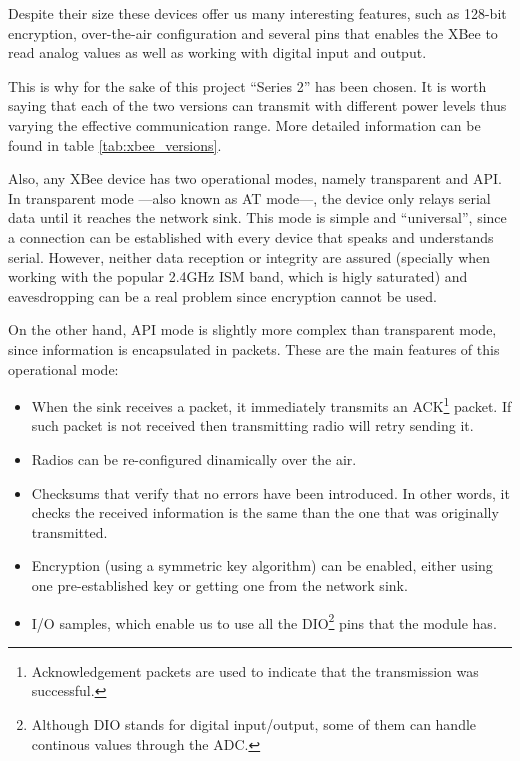 Despite their size these devices offer us many interesting features, such as 128-bit encryption, over-the-air configuration and several pins that enables the XBee to read analog values as well as working with digital input and output\citep{xbeedatasheet}.

This is why for the sake of this project ``Series 2'' has been chosen. It is worth saying that each of the two versions can transmit with different power levels thus varying the effective communication range\citep{faludi2010building}. More detailed information can be found in table \ref{tab:xbee_versions}.

Also, any XBee\textregistered{} device has two operational modes, namely transparent and API. In transparent mode ---also known as AT mode---, the device only relays serial data until it reaches the network sink. This mode is simple and ``universal'', since a connection can be established with every device that speaks and understands serial. However, neither data reception or integrity are assured (specially when working with the popular 2.4GHz ISM band, which is higly saturated) and eavesdropping can be a real problem since encryption cannot be used. 

On the other hand, API mode is slightly more complex than transparent mode, since information is encapsulated in packets. These are the main features of this operational mode:

\begin{itemize}
    \item When the sink receives a packet, it immediately transmits an ACK\footnote{Acknowledgement packets are used to indicate that the transmission was successful.} packet. If such packet is not received then transmitting radio will retry sending it.
    \item Radios can be re-configured dinamically over the air.
    \item Checksums that verify that no errors have been introduced. In other words, it checks the received information is the same than the one that was originally transmitted.
    \item Encryption (using a symmetric key algorithm) can be enabled, either using one pre-established key or getting one from the network sink.
    \item I/O samples, which enable us to use all the DIO\footnote{Although DIO stands for digital input/output, some of them can handle continous values through the ADC.} pins that the module has.
\end{itemize}

